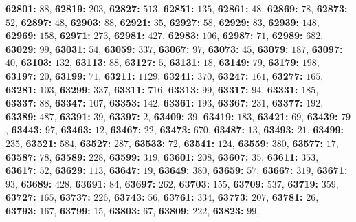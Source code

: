 \textsf{\bfseries 62801:} $88$, \textsf{\bfseries 62819:} $203$, \textsf{\bfseries 62827:} $513$, \textsf{\bfseries 62851:} $135$, \textsf{\bfseries 62861:} $48$, \textsf{\bfseries 62869:} $78$, \textsf{\bfseries 62873:} $52$, \textsf{\bfseries 62897:} $48$, \textsf{\bfseries 62903:} $88$, \textsf{\bfseries 62921:} $35$, \textsf{\bfseries 62927:} $58$, \textsf{\bfseries 62929:} $83$, \textsf{\bfseries 62939:} $148$, \textsf{\bfseries 62969:} $158$, \textsf{\bfseries 62971:} $273$, \textsf{\bfseries 62981:} $427$, \textsf{\bfseries 62983:} $106$, \textsf{\bfseries 62987:} $71$, \textsf{\bfseries 62989:} $682$, \textsf{\bfseries 63029:} $99$, \textsf{\bfseries 63031:} $54$, \textsf{\bfseries 63059:} $337$, \textsf{\bfseries 63067:} $97$, \textsf{\bfseries 63073:} $45$, \textsf{\bfseries 63079:} $187$, \textsf{\bfseries 63097:} $40$, \textsf{\bfseries 63103:} $132$, \textsf{\bfseries 63113:} $88$, \textsf{\bfseries 63127:} $5$, \textsf{\bfseries 63131:} $18$, \textsf{\bfseries 63149:} $79$, \textsf{\bfseries 63179:} $198$, \textsf{\bfseries 63197:} $20$, \textsf{\bfseries 63199:} $71$, \textsf{\bfseries 63211:} $1129$, \textsf{\bfseries 63241:} $370$, \textsf{\bfseries 63247:} $161$, \textsf{\bfseries 63277:} $165$, \textsf{\bfseries 63281:} $103$, \textsf{\bfseries 63299:} $337$, \textsf{\bfseries 63311:} $716$, \textsf{\bfseries 63313:} $99$, \textsf{\bfseries 63317:} $94$, \textsf{\bfseries 63331:} $185$, \textsf{\bfseries 63337:} $88$, \textsf{\bfseries 63347:} $107$, \textsf{\bfseries 63353:} $142$, \textsf{\bfseries 63361:} $193$, \textsf{\bfseries 63367:} $231$, \textsf{\bfseries 63377:} $192$, \textsf{\bfseries 63389:} $487$, \textsf{\bfseries 63391:} $39$, \textsf{\bfseries 63397:} $2$, \textsf{\bfseries 63409:} $39$, \textsf{\bfseries 63419:} $183$, \textsf{\bfseries 63421:} $69$, \textsf{\bfseries 63439:} $79$, \textsf{\bfseries 63443:} $97$, \textsf{\bfseries 63463:} $12$, \textsf{\bfseries 63467:} $22$, \textsf{\bfseries 63473:} $670$, \textsf{\bfseries 63487:} $13$, \textsf{\bfseries 63493:} $21$, \textsf{\bfseries 63499:} $235$, \textsf{\bfseries 63521:} $584$, \textsf{\bfseries 63527:} $287$, \textsf{\bfseries 63533:} $72$, \textsf{\bfseries 63541:} $124$, \textsf{\bfseries 63559:} $380$, \textsf{\bfseries 63577:} $17$, \textsf{\bfseries 63587:} $78$, \textsf{\bfseries 63589:} $228$, \textsf{\bfseries 63599:} $319$, \textsf{\bfseries 63601:} $208$, \textsf{\bfseries 63607:} $35$, \textsf{\bfseries 63611:} $353$, \textsf{\bfseries 63617:} $52$, \textsf{\bfseries 63629:} $113$, \textsf{\bfseries 63647:} $19$, \textsf{\bfseries 63649:} $380$, \textsf{\bfseries 63659:} $57$, \textsf{\bfseries 63667:} $319$, \textsf{\bfseries 63671:} $93$, \textsf{\bfseries 63689:} $428$, \textsf{\bfseries 63691:} $84$, \textsf{\bfseries 63697:} $262$, \textsf{\bfseries 63703:} $155$, \textsf{\bfseries 63709:} $537$, \textsf{\bfseries 63719:} $359$, \textsf{\bfseries 63727:} $165$, \textsf{\bfseries 63737:} $226$, \textsf{\bfseries 63743:} $56$, \textsf{\bfseries 63761:} $334$, \textsf{\bfseries 63773:} $207$, \textsf{\bfseries 63781:} $26$, \textsf{\bfseries 63793:} $167$, \textsf{\bfseries 63799:} $15$, \textsf{\bfseries 63803:} $67$, \textsf{\bfseries 63809:} $222$, \textsf{\bfseries 63823:} $99$, 
